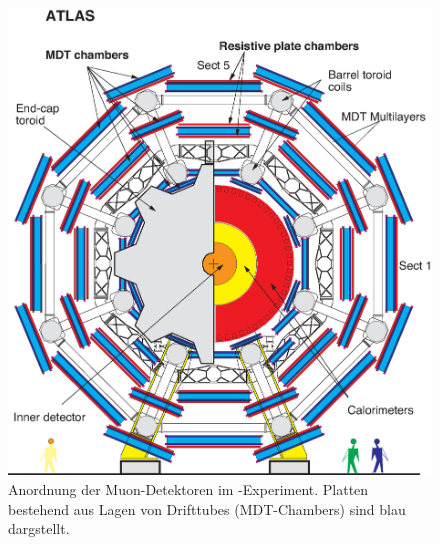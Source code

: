\begin{figure}
\centering
\includegraphics[scale=0.4]{input/Fig1a.eps}\caption{Anordnung der Muon-Detektoren im \atlas-Experiment. Platten bestehend aus Lagen von Drifttubes (MDT-Chambers) sind blau dargstellt\cite{2010EPJC...70..875A}.}\label{fig:muon}
\end{figure}



